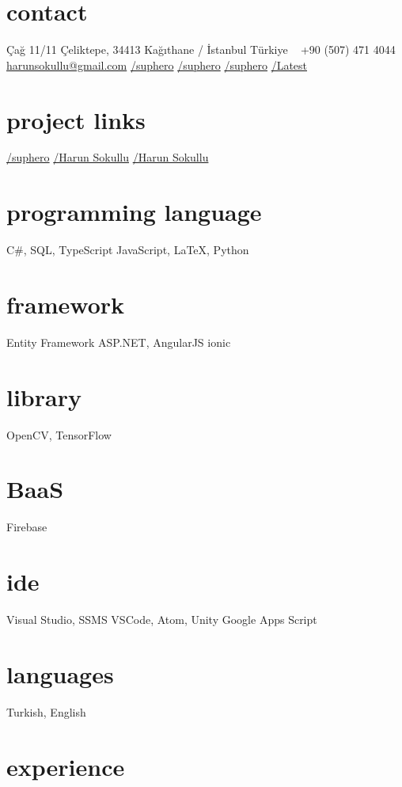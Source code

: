 \documentclass[]{../friggeri-cv} %
\begin{document}

\begin{aside}
\section{contact}
Çağ 11/11
Çeliktepe, 34413
Kağıthane / İstanbul
Türkiye
~
+90 (507) 471 4044
~
\href{mailto:harunsokullu@gmail.com}{harunsokullu@gmail.com}
\href{https://www.linkedin.com/in/suphero}{\faLinkedin/suphero}
\href{https://www.facebook.com/suphero}{\faFacebook/suphero}
\href{https://twitter.com/suphero}{\faTwitter/suphero}
\href{https://github.com/suphero/cv/raw/master/English/Harun\%20Sokullu.pdf}{\faFilePdfO/Latest}
\section{project links}
\href{https://github.com/suphero}{\faGithub/suphero}
\href{https://play.google.com/store/apps/developer?id=Harun+Sokullu}{\faAndroid/Harun Sokullu}
\href{https://itunes.apple.com/tr/developer/harun-sokullu/id1265151811}{\faApple/Harun Sokullu}
\section{programming language}
C\#, SQL, TypeScript
JavaScript, \LaTeX, Python
\section{framework}
Entity Framework
ASP.NET, AngularJS
ionic
\section{library}
OpenCV, TensorFlow
\section{BaaS}
Firebase
\section{ide}
Visual Studio, SSMS 
VSCode, Atom, Unity
Google Apps Script
\section{languages}
Turkish, English
\end{aside}

\section{experience}
\end{document}
